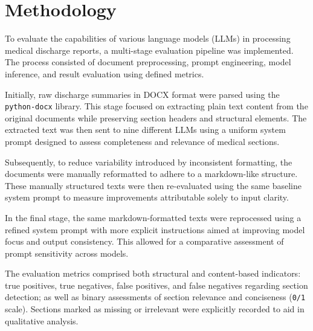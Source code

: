 \section{Methodology}

To evaluate the capabilities of various language models (LLMs) in 
processing medical discharge reports, a multi-stage evaluation pipeline 
was implemented. The process consisted of document preprocessing, 
prompt engineering, model inference, and result evaluation using defined metrics.

Initially, raw discharge summaries in DOCX format were parsed 
using the \texttt{python-docx} library. This stage focused on extracting 
plain text content from the original documents while preserving section 
headers and structural elements. The extracted text was then sent to nine 
different LLMs using a uniform system prompt designed to assess completeness and 
relevance of medical sections.

Subsequently, to reduce variability introduced by inconsistent formatting, 
the documents were manually reformatted to adhere to a markdown-like structure. 
These manually structured texts were then re-evaluated using the same baseline 
system prompt to measure improvements attributable solely to input clarity.

In the final stage, the same markdown-formatted texts were reprocessed using 
a refined system prompt with more explicit instructions aimed at improving model 
focus and output consistency. This allowed for a comparative assessment of 
prompt sensitivity across models.

The evaluation metrics comprised both structural and content-based indicators: 
true positives, true negatives, false positives, and false negatives regarding 
section detection; as well as binary assessments of section relevance and conciseness 
(\texttt{0/1} scale). Sections marked as missing or irrelevant were explicitly 
recorded to aid in qualitative analysis.

